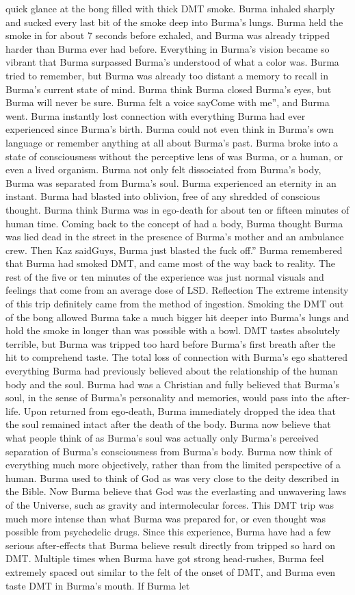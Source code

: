 \documentclass[12pt]{book}
\begin{document}
quick glance at the bong filled with thick DMT smoke. Burma inhaled sharply and sucked every last bit of the smoke deep into Burma's lungs. Burma held the smoke in for about 7 seconds before exhaled, and Burma was already tripped harder than Burma ever had before. Everything in Burma's vision became so vibrant that Burma surpassed Burma's understood of what a color was. Burma tried to remember, but Burma was already too distant a memory to recall in Burma's current state of mind. Burma think Burma closed Burma's eyes, but Burma will never be sure. Burma felt a voice sayCome with me'', and Burma went. Burma instantly lost connection with everything Burma had ever experienced since Burma's birth. Burma could not even think in Burma's own language or remember anything at all about Burma's past. Burma broke into a state of consciousness without the perceptive lens of was Burma, or a human, or even a lived organism. Burma not only felt dissociated from Burma's body, Burma was separated from Burma's soul. Burma experienced an eternity in an instant. Burma had blasted into oblivion, free of any shredded of conscious thought. Burma think Burma was in ego-death for about ten or fifteen minutes of human time. Coming back to the concept of had a body, Burma thought Burma was lied dead in the street in the presence of Burma's mother and an ambulance crew. Then Kaz saidGuys, Burma just blasted the fuck off.'' Burma remembered that Burma had smoked DMT, and came most of the way back to reality. The rest of the five or ten minutes of the experience was just normal visuals and feelings that come from an average dose of LSD. Reflection The extreme intensity of this trip definitely came from the method of ingestion. Smoking the DMT out of the bong allowed Burma take a much bigger hit deeper into Burma's lungs and hold the smoke in longer than was possible with a bowl. DMT tastes absolutely terrible, but Burma was tripped too hard before Burma's first breath after the hit to comprehend taste. The total loss of connection with Burma's ego shattered everything Burma had previously believed about the relationship of the human body and the soul. Burma had was a Christian and fully believed that Burma's soul, in the sense of Burma's personality and memories, would pass into the after-life. Upon returned from ego-death, Burma immediately dropped the idea that the soul remained intact after the death of the body. Burma now believe that what people think of as Burma's soul was actually only Burma's perceived separation of Burma's consciousness from Burma's body. Burma now think of everything much more objectively, rather than from the limited perspective of a human. Burma used to think of God as was very close to the deity described in the Bible. Now Burma believe that God was the everlasting and unwavering laws of the Universe, such as gravity and intermolecular forces. This DMT trip was much more intense than what Burma was prepared for, or even thought was possible from psychedelic drugs. Since this experience, Burma have had a few serious after-effects that Burma believe result directly from tripped so hard on DMT. Multiple times when Burma have got strong head-rushes, Burma feel extremely spaced out similar to the felt of the onset of DMT, and Burma even taste DMT in Burma's mouth. If Burma let 
\end{document}
